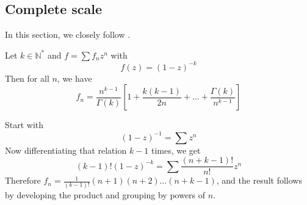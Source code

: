 \documentclass[../main.tex]{subfiles}
\begin{document}
%
%	
%	
%	


\subsection*{Complete scale}

In this section, we closely follow \cite{Jungen1931}.

\begin{lemma}{}
	Let $k \in \mathbb{N}^*$ and $f = \sum f_n z^n$ with
	$$
	f(z) = {(1 - z)}^{-k}
	$$
	Then for all $n$, we have
	$$
	f_n = \frac{n^{k - 1}}{\Gamma(k)} \left[1 + \frac{k(k-1)}{2n} + \dots + \frac{\Gamma(k)}{n^{k-1}}\right]
	$$
	
	\tcblower
	
	Start with
	$${(1 - z)}^{-1} = \sum z^n$$
	Now differentiating that relation $k - 1$ times, we get
	$$
	(k-1)! {(1-z)}^{-k} = \sum \frac{(n + k -1)!}{n!}z^n
	$$
	Therefore $f_n = \frac{1}{(k-1)!} (n+1)(n+2)\dots(n+k-1)$, and the result follows by developing the product and grouping by powers of $n$.
\end{lemma}
\end{document}
